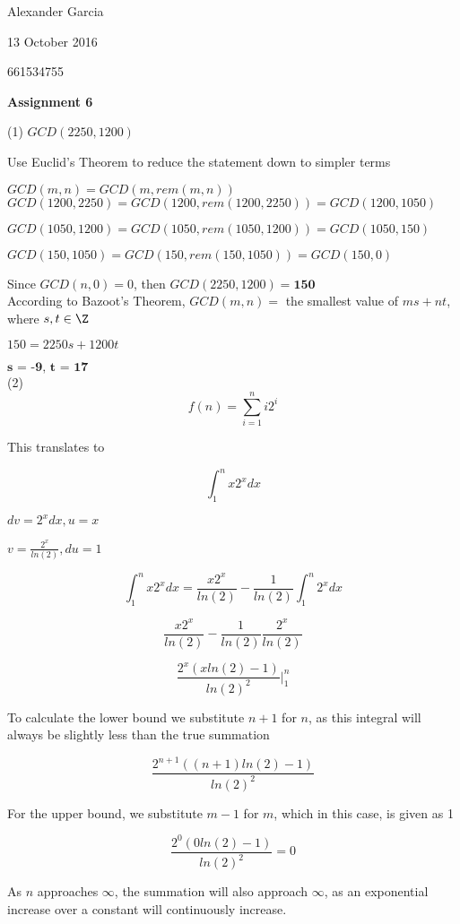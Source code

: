 \documentclass[]{article}
\begin{document}
Alexander Garcia

13 October 2016

661534755

\centerline{\bf \Large Assignment 6}

\medskip

\noindent (1) $GCD(2250,1200)$

Use Euclid's Theorem to reduce the statement down to simpler terms

$GCD(m,n) = GCD(m, rem(m,n))$ \\

$GCD(1200,2250) = GCD(1200, rem(1200,2250)) = GCD(1200, 1050)$

$GCD(1050,1200) = GCD(1050, rem(1050,1200)) = GCD(1050,150)$

$GCD(150,1050) = GCD(150, rem(150,1050)) = GCD(150,0)$

Since $GCD(n, 0) = 0$, then $GCD(2250,1200) = \textbf{150}$ \\

According to Bazoot's Theorem, $GCD(m,n) = $ the smallest value of $ms+nt$, where $s,t \in \Z$

$150 = 2250s + 1200t$

$\textbf{s = -9, t = 17}$ \\



\noindent (2) $$f(n) = \sum_{i=1}^{n}{i2^i}$$

This translates to 

$$\int_{1}^{n}{x2^x dx}$$

$dv = 2^x dx, u= x$

$v = \frac{2^x}{ln(2)}, du = 1$

$$\int_{1}^{n}{x2^x dx} = \frac{x2^x}{ln(2)} - \frac{1}{ln(2)}\int_{1}^{n}{2^x dx}$$

$$\frac{x2^x}{ln(2)} - \frac{1}{ln(2)} \frac{2^x}{ln(2)}$$

$$\frac{2^x(xln(2)-1)}{ln(2)^2} | ^{n} _{1}$$

To calculate the lower bound we substitute $n+1$ for $n$, as this integral will always be slightly less than the true summation

$$\frac{2^{n+1}((n+1)ln(2)-1)}{ln(2)^2}$$

For the upper bound, we substitute $m-1$ for $m$, which in this case, is given as 1

$$\frac{2^0(0ln(2)-1)}{ln(2)^2} = 0$$

As $n$ approaches $\infty$, the summation will also approach $\infty$, as an exponential increase over a constant will continuously increase.
\end{document}
